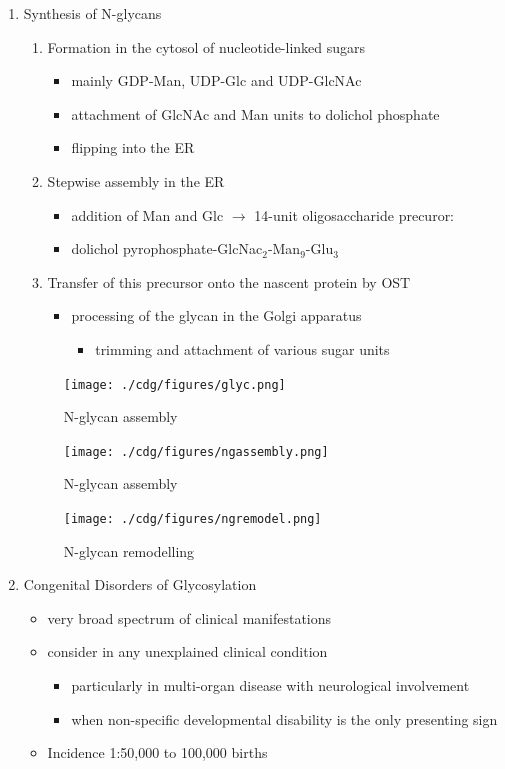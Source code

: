 \documentclass{scrartcl}
\begin{document}
\begin{enumerate}
\item Synthesis of N-glycans
\label{sec:org4e15538}
\begin{enumerate}
\item Formation in the cytosol of nucleotide-linked sugars
\begin{itemize}
\item mainly GDP-Man, UDP-Glc and UDP-GlcNAc
\item attachment of GlcNAc and Man units to dolichol phosphate
\item flipping into the ER
\end{itemize}
\item Stepwise assembly in the ER
\begin{itemize}
\item addition of Man and Glc \(\to\) 14-unit oligosaccharide precuror:
\item dolichol pyrophosphate-GlcNac\(_{\text{2}}\)-Man\(_{\text{9}}\)-Glu\(_{\text{3}}\)
\end{itemize}
\item Transfer of this precursor onto the nascent protein by OST
\begin{itemize}
\item processing of the glycan in the Golgi apparatus
\begin{itemize}
\item trimming and attachment of various sugar units
\end{itemize}
\end{itemize}
\end{enumerate}

\begin{figure}[htbp]
\centering
\texttt{[image: ./cdg/figures/glyc.png]}
\caption{\label{fig:orga989fba}
N-glycan assembly}
\end{figure}

\begin{figure}[htbp]
\centering
\texttt{[image: ./cdg/figures/ngassembly.png]}
\caption{\label{fig:org42fccb5}
N-glycan assembly}
\end{figure}

\begin{figure}[htbp]
\centering
\texttt{[image: ./cdg/figures/ngremodel.png]}
\caption{\label{fig:org1bbbdd1}
N-glycan remodelling}
\end{figure}

\item Congenital Disorders of Glycosylation
\label{sec:org074bf91}
\begin{itemize}
\item very broad spectrum of clinical manifestations
\item consider in any unexplained clinical condition
\begin{itemize}
\item particularly in multi-organ disease with neurological involvement
\item when non-specific developmental disability is the only presenting sign
\end{itemize}
\item Incidence 1:50,000 to 100,000 births
\end{itemize}


\end{enumerate}
\end{document}
